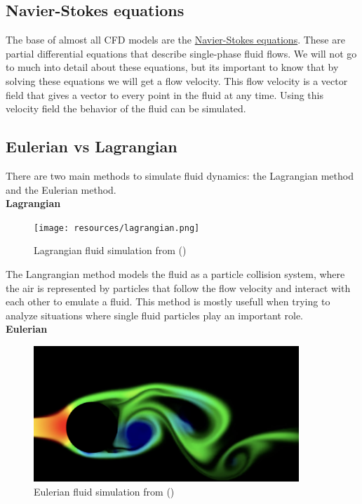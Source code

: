 \documentclass[a4paper,12pt,titlepage]{article}
\begin{document}
\subsection{Navier-Stokes equations} \label{navierstokes}
The base of almost all CFD models are the \href{https://en.wikipedia.org/wiki/Navier%E2%80%93Stokes_equations}{Navier-Stokes equations}.
These are partial differential equations that describe single-phase fluid flows. 
We will not go to much into detail about these equations, but its important to know that by solving these equations we will get a flow velocity.
This flow velocity is a vector field that gives a vector to every point in the fluid at any time. 
Using this velocity field the behavior of the fluid can be simulated.

\subsection{Eulerian vs Lagrangian} \label{eulerianlagrangian}
There are two main methods to simulate fluid dynamics: the Lagrangian method and the Eulerian method. \\

\textbf{Lagrangian} \\

\begin{figure}[H]
	\centering
	\texttt{[image: resources/lagrangian.png]}
	\caption{Lagrangian fluid simulation from (\cite{seblague})}
\end{figure}

The Langrangian method models the fluid as a particle collision system, where the air is represented by
particles that follow the flow velocity and interact with each other to emulate a fluid. 
This method is mostly usefull when trying to analyze situations where single fluid particles play an important role.\\


\textbf{Eulerian} \\

\begin{figure}[H]
	\centering
	\includegraphics[width=10cm]{resources/eulerian.png}
	\caption{Eulerian fluid simulation from (\cite{tenminute})}
\end{figure}
\end{document}
